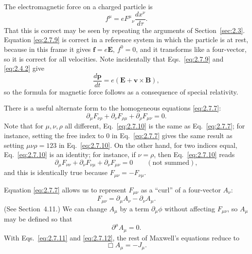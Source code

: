 The electromagnetic force on a charged particle is
\begin{equation}
  f^\mu=eF^\mu{}_\nu\frac{dx^\nu}{d\tau}.
  \tag{2.7.9}\label{eq:2.7.9}
\end{equation}
That this is correct may be seen by repeating the arguments of
Section~\ref{sec:2.3}. Equation \eqref{eq:2.7.9} is correct in a reference
system in which the particle is at rest, because in this frame it gives
\(\mathbf f=e\mathbf E,\ f^0=0\), and it transforms like a four-vector, so it
is correct for all velocities. Note incidentally that Eqs.~\eqref{eq:2.7.9}
and \eqref{eq:2.4.2} give
\[
  \frac{d\mathbf p}{dt}
  =e(\mathbf E+\mathbf v\times\mathbf B),
\]
so the formula for magnetic force follows as a consequence of special
relativity.

There is a useful alternate form to the homogeneous equations
\eqref{eq:2.7.7}:
\begin{equation}
  \partial_\mu F_{\nu\rho}
  +\partial_\nu F_{\rho\mu}
  +\partial_\rho F_{\mu\nu}=0 .
  \tag{2.7.10}\label{eq:2.7.10}
\end{equation}
Note that for \(\mu,\nu,\rho\) all different, Eq.~\eqref{eq:2.7.10} is the
same as Eq.~\eqref{eq:2.7.7}; for instance, setting the free index to \(0\) in
Eq.~\eqref{eq:2.7.7} gives the same result as setting
\(\mu\nu\rho=123\) in Eq.~\eqref{eq:2.7.10}. On the other hand, for two
indices equal, Eq.~\eqref{eq:2.7.10} is an identity; for instance, if
\(\nu=\rho\), then Eq.~\eqref{eq:2.7.10} reads
\[
  \partial_\mu F_{\nu\nu}
  +\partial_\nu F_{\nu\mu}
  +\partial_\nu F_{\mu\nu}=0
  \qquad(\text{not summed}),
\]
and this is identically true because \(F_{\mu\nu}=-F_{\nu\mu}\).

Equation \eqref{eq:2.7.7} allows us to represent \(F_{\mu\nu}\) as a
``curl'' of a four-vector \(A_\nu\):
\begin{equation}
  F_{\mu\nu}=\partial_\mu A_\nu-\partial_\nu A_\mu .
  \tag{2.7.11}\label{eq:2.7.11}
\end{equation}
(See Section~4.11.) We can change \(A_\mu\) by a term
\(\partial_\mu\phi\) without affecting \(F_{\mu\nu}\), so \(A_\mu\) may be
defined so that
\begin{equation}
  \partial^\mu A_\mu=0 .
  \tag{2.7.12}\label{eq:2.7.12}
\end{equation}
With Eqs.~\eqref{eq:2.7.11} and \eqref{eq:2.7.12}, the rest of Maxwell's
equations reduce to
\begin{equation}
  \Box A_\mu=-J_\mu .
  \tag{2.7.13}\label{eq:2.7.13}
\end{equation}
